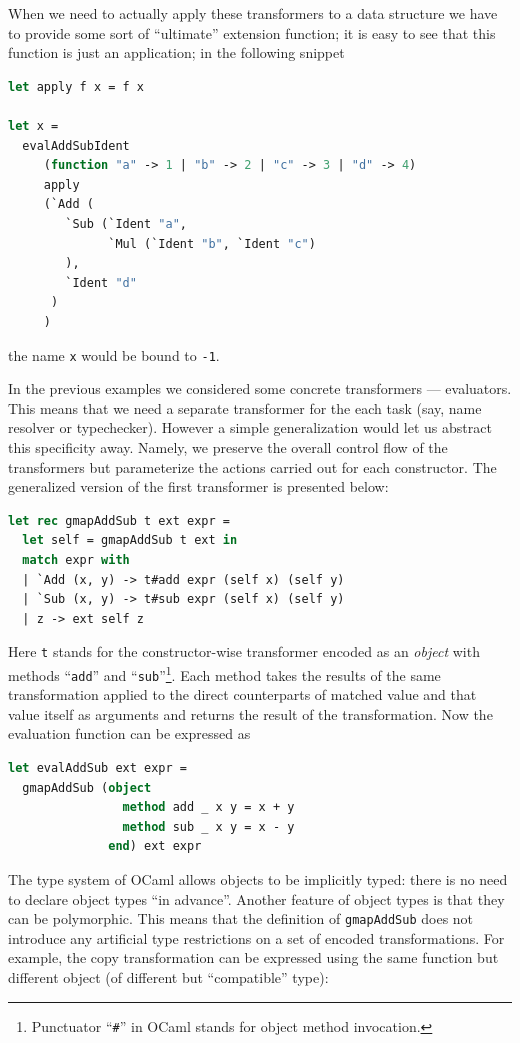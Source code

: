 When we need to actually apply these transformers to a data structure we have to provide
some sort of ``ultimate'' extension function; it is easy to see that this function is just
an application; in the following snippet

\begin{lstlisting}[language=ocaml]
let apply f x = f x

let x = 
  evalAddSubIdent 
     (function "a" -> 1 | "b" -> 2 | "c" -> 3 | "d" -> 4)
     apply 
     (`Add (
        `Sub (`Ident "a", 
              `Mul (`Ident "b", `Ident "c")
        ), 
        `Ident "d"
      )
     )
\end{lstlisting}

the name \lstinline{x} would be bound to \lstinline{-1}.

In the previous examples we considered some concrete transformers --- evaluators. This means
that we need a separate transformer for the each task (say, name resolver or typechecker).
However a simple generalization would let us abstract this specificity away. Namely, 
we preserve the overall control flow of the transformers but parameterize the
actions carried out for each constructor. The generalized version of the first 
transformer is presented below:

\begin{lstlisting}[language=ocaml]
let rec gmapAddSub t ext expr =
  let self = gmapAddSub t ext in
  match expr with
  | `Add (x, y) -> t#add expr (self x) (self y)
  | `Sub (x, y) -> t#sub expr (self x) (self y)
  | z -> ext self z
\end{lstlisting}

Here \lstinline{t} stands for the constructor-wise transformer encoded
as an \emph{object} with methods ``\lstinline{add}'' and ``\lstinline{sub}''\footnote{Punctuator ``\lstinline{#}'' 
in OCaml stands for object method invocation.}.
Each method takes the results of the same transformation applied to the
direct counterparts of matched value and that value itself as arguments
and returns the result of the transformation. Now the evaluation function
can be expressed as

\begin{lstlisting}[language=ocaml]
let evalAddSub ext expr = 
  gmapAddSub (object
                method add _ x y = x + y
                method sub _ x y = x - y
              end) ext expr
\end{lstlisting}

The type system of OCaml allows objects to be implicitly typed: there is 
no need to declare object types ``in advance''. Another feature of object
types is that they can be polymorphic. This means that the definition of
\lstinline{gmapAddSub} does not introduce any artificial type restrictions
on a set of encoded transformations. For example, the copy transformation
can be expressed using the same function but different object (of different but
``compatible'' type):

